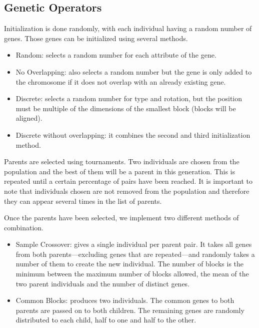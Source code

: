 \subsection{Genetic Operators}

Initialization is done randomly, with each individual having a random number of genes. Those genes can be initialized using several methods. 

\begin{itemize}
	\item Random: selects a random number for each attribute of the gene.
	\item No Overlapping: also selects a random number but the gene is only added to the chromosome if it does not overlap with an already existing gene.
	\item Discrete: selects a random number for type and rotation, but the position must be multiple of the dimensions of the smallest block (blocks will be aligned).
	\item Discrete without overlapping: it combines the second and third initialization method.
\end{itemize}

Parents are selected using tournaments. Two individuals are chosen from the population and the best of them will be a parent in this generation. This is repeated until a certain percentage of pairs have been reached. It is important to note that individuals chosen are not removed from the population and therefore they can appear several times in the list of parents. 


Once the parents have been selected, we implement two different methods of combination.
\begin{itemize}
	\item Sample Crossover: gives a single individual per parent pair. It takes all genes from both parents---excluding genes that are repeated---and randomly takes a number of them to create the new individual. The number of blocks is the minimum between the maximum number of blocks allowed, the mean of the two parent individuals and the number of distinct genes.
	\item Common Blocks: produces two individuals. The common genes to both parents are passed on to both children. The remaining genes are randomly distributed to each child, half to one and half to the other. 
\end{itemize}

